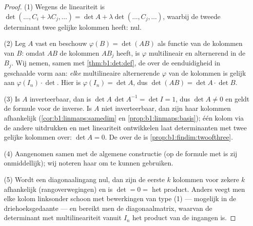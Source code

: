 \begin{proof}
(1) Wegens de lineariteit is $\det(\dots, C_i + \lambda C_j, \dots)
= \det A + \lambda\det(\dots, C_j, \dots)$, waarbij de tweede
determinant twee gelijke kolommen heeft: nul.

(2) Leg $A$ vast en beschouw $\varphi(B) = \det(AB)$ als functie van
de kolommen van $B$: omdat $AB$ de kolommen $AB_j$ heeft, is
$\varphi$ multilineair en alternerend in de $B_j$. Wij nemen, samen
met \cref{thm:b1:det:def}, de  over de eenduidigheid in
geschaalde vorm aan: \emph{elke} multilineaire alternerende
 $\varphi$ van de kolommen is gelijk aan $\varphi(I_n)
\cdot \det$. Hier is $\varphi(I_n) = \det A$, dus $\det(AB) = \det A
\cdot \det B$.

(3) Is $A$ inverteerbaar, dan is $\det A\,\det A^{-1} = \det I = 1$,
dus $\det A \neq 0$ en geldt de formule voor de inverse. Is $A$ niet
inverteerbaar, dan zijn haar kolommen afhankelijk
(\cref{cor:b1:linmaps:samedim} en \cref{prop:b1:linmaps:basis}); één
kolom via de andere uitdrukken en met lineariteit ontwikkelen laat
determinanten met twee gelijke kolommen over: $\det A = 0$. De
 over de  is \cref{prop:b1:findim:twoofthree}.

(4) Aangenomen samen met de algemene constructie (op de formule met
 is zij onmiddellijk); wij noteren haar om 
te kunnen gebruiken.

(5) Wordt een diagonaalingang nul, dan zijn de eerste $k$ kolommen
voor zekere $k$ afhankelijk (rangoverwegingen) en is $\det = 0 = $
het product. Anders veegt men elke kolom linksonder schoon met
bewerkingen van type (1) --- mogelijk in de driehoeksgedaante ---
en bereikt men de diagonaalmatrix, waarvan de determinant met
multilineariteit vanuit $I_n$ het product van de ingangen is.
\end{proof}

